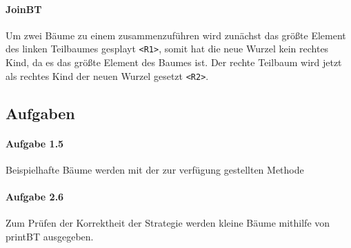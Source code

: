 \paragraph{JoinBT}\label{par:joinbt}
Um zwei Bäume zu einem zusammenzuführen wird zunächst das größte Element des linken Teilbaumes
gesplayt \verb|<R1>|, somit hat die neue Wurzel kein rechtes Kind, da es das größte Element des
Baumes ist.
Der rechte Teilbaum wird jetzt als rechtes Kind der neuen Wurzel gesetzt \verb|<R2>|.

\subsection{Aufgaben}\label{subsec:aufgaben2}

\paragraph{Aufgabe 1.5}
Beispielhafte Bäume werden mit der zur verfügung gestellten Methode\\

\paragraph{Aufgabe 2.6} Zum Prüfen der Korrektheit der Strategie werden kleine Bäume mithilfe von
printBT ausgegeben.
